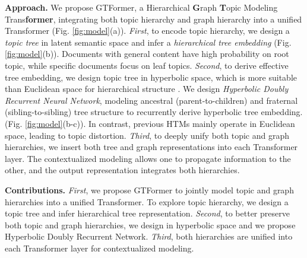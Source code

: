 \textbf{Approach.} %
We propose GTFormer, a Hierarchical \textbf{G}raph \textbf{T}opic Modeling Trans\textbf{former}, integrating both topic hierarchy and graph hierarchy into a unified Transformer (Fig. \ref{fig:model}(a)). \emph{First}, to encode topic hierarchy, we design a \emph{topic tree} in latent semantic space and infer a \emph{hierarchical tree embedding} (Fig. \ref{fig:model}(b)). Documents with general content have high probability on root topic, while specific documents focus on leaf topics. \emph{Second}, to derive effective tree embedding, %
we design topic tree in hyperbolic space, which is more suitable than Euclidean space for hierarchical structure \cite{hgcn}. We design \emph{Hyperbolic Doubly Recurrent Neural Network}, modeling ancestral (parent-to-children) and fraternal (sibling-to-sibling) tree structure to recurrently derive hyperbolic tree embedding. (Fig. \ref{fig:model}(b-c)). In contrast, previous HTMs mainly operate in Euclidean space, leading to topic distortion. \emph{Third}, to deeply unify both topic and graph hierarchies, we insert both tree and graph representations into each Transformer layer. The contextualized modeling allows one to propagate information to the other, and the output representation integrates both hierarchies. %

\textbf{Contributions.} \emph{First}, we propose GTFormer to jointly model topic and graph hierarchies into a unified Transformer. To explore topic hierarchy, we design a topic tree and infer hierarchical tree representation. \emph{Second}, to better preserve both topic and graph hierarchies, we design in hyperbolic space and we propose Hyperbolic Doubly Recurrent Network. \emph{Third}, both hierarchies are unified into each Transformer layer for contextualized modeling. %